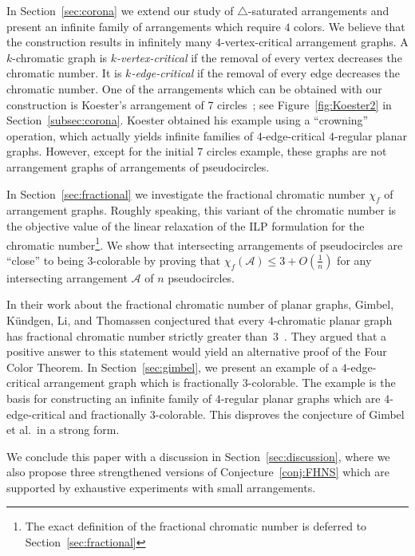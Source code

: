 \documentclass[fontsize=11pt,a4paper,DIV12]{scrartcl}
\begin{document}
In Section~\ref{sec:corona} we extend our study of $\triangle$-saturated
arrangements and present an infinite family of arrangements which require $4$
colors. We believe that the construction results
in infinitely many $4$-vertex-critical arrangement graphs. 
A $k$-chromatic graph is \emph{$k$-vertex-critical} 
if the removal of every vertex decreases the chromatic number.  
It is \emph{$k$-edge-critical} if the removal of every edge decreases the chromatic number.
One of the arrangements which can be obtained with our construction is
Koester's arrangement of 7 circles~\cite{Koester1985}; see
Figure~\ref{fig:Koester2} in Section~\ref{subsec:corona}. 
Koester obtained his example using a ``crowning'' operation, which actually yields infinite
families of $4$-edge-critical $4$-regular planar graphs.  However, except for
the initial 7 circles example, these graphs are not arrangement graphs of arrangements of pseudocircles.

In Section~\ref{sec:fractional} we investigate the fractional chromatic number
$\chi_f$ of arrangement graphs. Roughly speaking, this variant of the chromatic number is the
objective value of the linear relaxation of the ILP formulation for the
chromatic number\footnote{The exact definition of the fractional chromatic number is deferred to Section~\ref{sec:fractional}}.  
We show that intersecting arrangements of pseudocircles are
``close'' to being $3$-colorable by proving that
$\chi_f(\mathcal{A}) \le 3+O(\frac{1}{n})$ 
for any intersecting arrangement $\mathcal{A}$ of $n$ pseudocircles.

 
In their work about the fractional chromatic number of planar graphs, 
Gimbel, K\"{u}ndgen, Li, and Thomassen conjectured that every $4$-chromatic planar
graph has fractional chromatic number strictly greater
than~$3$~\cite[Conjecture~3.2]{GimbelKLT2019}. They argued that a positive
answer to this statement would yield an alternative proof of the Four Color
Theorem.  In Section~\ref{sec:gimbel}, we present an example of a
$4$-edge-critical arrangement graph which is fractionally $3$-colorable.  The
example is the basis for constructing an infinite family of $4$-regular planar
graphs which are $4$-edge-critical and fractionally $3$-colorable.  This
disproves the conjecture of Gimbel et al.~in a strong form.

We conclude this paper with a discussion in Section~\ref{sec:discussion}, where we also propose three 
strengthened versions of Conjecture~\ref{conj:FHNS} which are
supported by exhaustive experiments with small arrangements.
\end{document}
